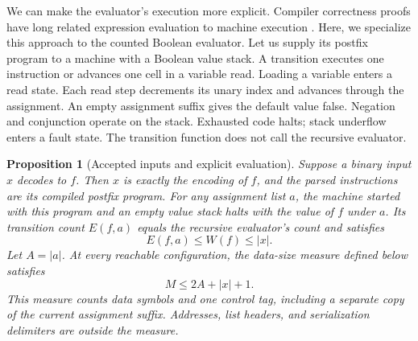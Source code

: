 \documentclass[11pt,a4paper]{article}
\numberwithin{equation}{section}
\theoremstyle{plain}
\newtheorem{proposition}[lemma]{Proposition}
\theoremstyle{definition}
\theoremstyle{remark}
\begin{document}
We can make the evaluator's execution more explicit. Compiler correctness proofs have long related expression evaluation to machine execution \citep{mccarthy1967compiler}. Here, we specialize this approach to the counted Boolean evaluator. Let us supply its postfix program to a machine with a Boolean value stack. A transition executes one instruction or advances one cell in a variable read. Loading a variable enters a read state. Each read step decrements its unary index and advances through the assignment. An empty assignment suffix gives the default value false. Negation and conjunction operate on the stack. Exhausted code halts; stack underflow enters a fault state. The transition function does not call the recursive evaluator.

\begin{proposition}[Accepted inputs and explicit evaluation]
\label{prop:evaluator-machine}
Suppose a binary input $x$ decodes to $f$. Then $x$ is exactly the encoding of $f$, and the parsed instructions are its compiled postfix program. For any assignment list $a$, the machine started with this program and an empty value stack halts with the value of $f$ under $a$. Its transition count $E(f,a)$ equals the recursive evaluator's count and satisfies
\begin{equation}
E(f,a)\leq W(f)\leq |x|.
\label{eq:evaluator-steps}
\end{equation}
Let $A=|a|$. At every reachable configuration, the data-size measure defined below satisfies
\begin{equation}
M\leq 2A+|x|+1.
\label{eq:evaluator-data}
\end{equation}
This measure counts data symbols and one control tag, including a separate copy of the current assignment suffix. Addresses, list headers, and serialization delimiters are outside the measure.
\end{proposition}
\end{document}
